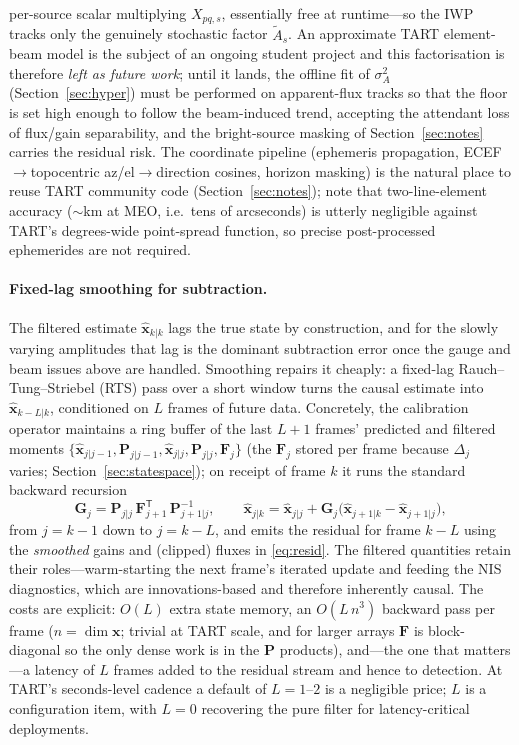 \documentclass[11pt]{article}
\newcommand{\T}{^{\mathsf{T}}}
\begin{document}
per-source scalar multiplying $X_{pq,s}$, essentially free at runtime---so the IWP tracks only the
genuinely stochastic factor $\tilde A_s$. An approximate TART element-beam model is the subject of
an ongoing student project and this factorisation is therefore \emph{left as future work}; until it
lands, the offline fit of $\sigma_A^2$ (Section~\ref{sec:hyper}) must be performed on apparent-flux
tracks so that the floor is set high enough to follow the beam-induced trend, accepting the
attendant loss of flux/gain separability, and the bright-source masking of Section~\ref{sec:notes}
carries the residual risk. The coordinate pipeline (ephemeris propagation,
ECEF$\to$topocentric az/el$\to$direction cosines, horizon masking) is the natural place to reuse TART
community code (Section~\ref{sec:notes}); note that two-line-element accuracy ($\sim$km at MEO,
i.e.\ tens of arcseconds) is utterly negligible against TART's degrees-wide point-spread function,
so precise post-processed ephemerides are not required.

\paragraph{Fixed-lag smoothing for subtraction.} The filtered estimate $\hat{\bm{x}}_{k|k}$ lags
the true state by construction, and for the slowly varying amplitudes that lag is the dominant
subtraction error once the gauge and beam issues above are handled. Smoothing repairs it cheaply: a
fixed-lag Rauch--Tung--Striebel (RTS) pass over a short window turns the causal estimate into
$\hat{\bm{x}}_{k-L|k}$, conditioned on $L$ frames of future data. Concretely, the calibration
operator maintains a ring buffer of the last $L{+}1$ frames' predicted and filtered moments
$\{\hat{\bm{x}}_{j|j-1},\bm{P}_{j|j-1},\hat{\bm{x}}_{j|j},\bm{P}_{j|j},\bm{F}_j\}$ (the $\bm{F}_j$
stored per frame because $\Delta_j$ varies; Section~\ref{sec:statespace}); on receipt of frame $k$
it runs the standard backward recursion
\begin{equation}
  \bm{G}_j=\bm{P}_{j|j}\,\bm{F}_{j+1}\T\,\bm{P}_{j+1|j}^{-1},\qquad
  \hat{\bm{x}}_{j|k}=\hat{\bm{x}}_{j|j}+\bm{G}_j\big(\hat{\bm{x}}_{j+1|k}-\hat{\bm{x}}_{j+1|j}\big),
\end{equation}
from $j=k-1$ down to $j=k-L$, and emits the residual for frame $k-L$ using the \emph{smoothed} gains
and (clipped) fluxes in \eqref{eq:resid}. The filtered quantities retain their roles---warm-starting
the next frame's iterated update and feeding the NIS diagnostics, which are innovations-based and
therefore inherently causal. The costs are explicit: $O(L)$ extra state memory, an $O(L\,n^3)$
backward pass per frame ($n=\dim\bm{x}$; trivial at TART scale, and for larger arrays $\bm{F}$ is
block-diagonal so the only dense work is in the $\bm{P}$ products), and---the one that matters---a
latency of $L$ frames added to the residual stream and hence to detection. At TART's seconds-level
cadence a default of $L=1$--$2$ is a negligible price; $L$ is a configuration item, with $L=0$
recovering the pure filter for latency-critical deployments.
\end{document}
